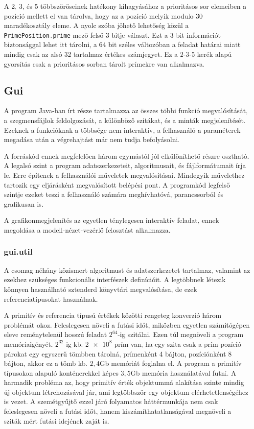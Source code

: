 A 2, 3, és 5 többszöröseinek hatékony kihagyásához a prioritásos sor elemeiben a pozíció mellett el van tárolva, hogy az a pozíció melyik modulo $30$ maradékosztály eleme.
A nyolc szóba jöhető lehetőség közül a \texttt{PrimePosition.prime} mező felső 3 bitje választ.
Ezt a 3 bit információt biztonsággal lehet itt tárolni, a 64 bit széles változóban a feladat határai miatt mindig csak az alsó 32 tartalmaz értékes számjegyet.
Ez a 2-3-5 kerék alapú gyorsítás csak a prioritásos sorban tárolt prímekre van alkalmazva.

\subsection{Gui}

A program Java-ban írt része tartalmazza az összes többi funkció megvalósítását, a szegmensfájlok feldolgozását, a különböző szitákat, és a minták megjelenítését.
Ezeknek a funkcióknak a többsége nem interaktív, a felhasználó a paraméterek megadása után a végrehajtást már nem tudja befolyásolni.

A forráskód ennek megfelelően három egymástól jól elkülöníthető részre osztható.
A legalsó szint a program adatszerkezeteit, algoritmusait, és fájlformátumait írja le. 
Erre építenek a felhasználói műveletek megvalósításai.
Mindegyik művelethez tartozik egy eljárásként megvalósított belépési pont.
A programkód legfelső szintje ezeket teszi a felhasználó számára meghívhatóvá, parancssorból és grafikusan is.

A grafikonmegjelenítés az egyetlen ténylegesen interaktív feladat, ennek megoldása a modell-nézet-vezérlő felosztást alkalmazza.

\subsubsection{gui.util}

A csomag néhány közismert algoritmust és adatszerkezetet tartalmaz, valamint az ezekhez szükséges funkcionális interfészek definícióit.
A legtöbbnek létezik könnyen használható sztenderd könyvtári megvalósítása, de ezek referenciatípusokat használnak.

A primitív és referencia típusú értékek közötti rengeteg konverzió három problémát okoz.
Feleslegesen növeli a futási időt, miközben egyetlen számítógépen eleve reménytelenül hosszú feladat $2^{64}$-ig szitálni.
Ezen túl megnöveli a program memóriaigényét.
$2^{32}$-ig kb. $\num{2e8}$ prím van, ha egy szita csak a prím-pozíció párokat egy egyszerű tömbben tárolná, prímenként 4 bájton, pozíciónként 8 bájton, akkor ez a tömb kb. $2,4$Gb memóriát foglalna el.
A program a primitív típusokon alapuló konténerekkel képes $3,5$Gb memória használatával futni.
A harmadik probléma az, hogy primitív érték objektummá alakítása szinte mindig új objektum létrehozásával jár, ami legtöbbször egy objektum elérhetetlenségéhez is vezet.
A szemétgyűjtő ezzel járó folyamatos háttérmunkája nem csak feleslegesen növeli a futási időt, hanem kiszámíthatatlanságával megnöveli a sziták mért futási idejének zaját is.

